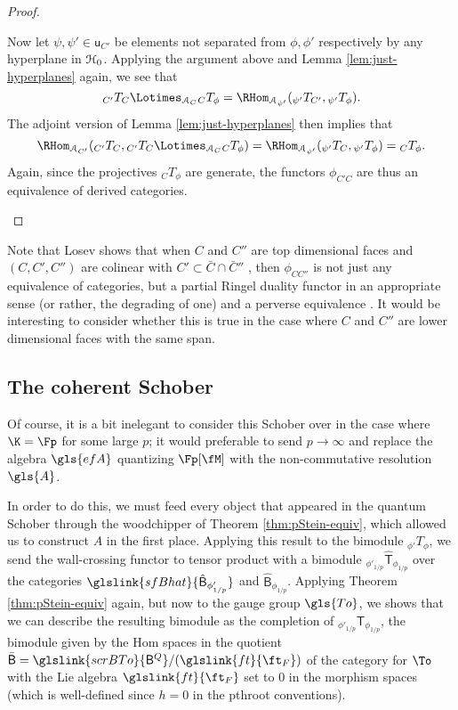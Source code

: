 \begin{proof}
\begin{enumerate}[wide]
  Now let $\psi,\psi'\in \mathsf{u}_{C'}$ be elements not separated from $\phi,\phi'$ respectively by any hyperplane in $\EuScript{H}_0$.  Applying the argument above and Lemma \ref{lem:just-hyperplanes}  again, we see that
  \[{}_{{C'}}T_C\Lotimes_{\EuScript{A}_C}{}_{C}T_{\phi}= \RHom_{\EuScript{A}_{\psi'}}({}_{\psi'}T_{{C'}},  {}_{\psi'}T_\phi).\]  The adjoint version of Lemma  \ref{lem:just-hyperplanes} then implies that
  \[  \RHom_{\EuScript{A}_{C'}}({}_{{C'}}T_C , {}_{{C'}}T_C\Lotimes_{\EuScript{A}_C}{}_{C}T_{\phi})=\RHom_{\EuScript{A}_{\psi'}}({}_{\psi'}T_{C},  {}_{\psi'}T_\phi)={}_{C}T_{\phi}.\]  Again, since the projectives ${}_{C}T_{\phi}$ are generate, the functors $\phi_{{C'}C}$ are thus an equivalence of derived categories.  \qedhere
 \end{enumerate} 
 \end{proof}

Note that Losev shows that when $C$ and $C''$ are top dimensional faces and $(C,{C'},C'')$ are colinear with ${C'}\subset \bar{C}\cap \bar{C}''$ , then $\phi_{CC''}$ is not just any equivalence of categories, but a partial Ringel duality functor in an appropriate sense (or rather, the degrading of one) and a perverse equivalence \cite[Thm. 9.10]{losev2017modular}.  It would be interesting to consider whether this is true in the case where $C$ and $C''$ are lower dimensional faces with the same span.    

\subsection{The coherent Schober}
\label{sec:coherent-schober}

Of course, it is a bit inelegant to consider this Schober over in the case where $\K=\Fp$ for some large $p$; it would preferable to send $p\to \infty $ and replace the algebra $\gls{efA}$  quantizing $\Fp[\fM]$ with the non-commutative resolution $\gls{A}$.    

In order to do this, we must feed every object that appeared in the quantum Schober through the woodchipper of Theorem \ref{thm:pStein-equiv}, which allowed us to construct $A$ in the first place.  
Applying this result to the bimodule ${}_{\phi'}T_\phi$, we send the wall-crossing functor to tensor product with a bimodule $ {}_{\phi'_{1/p}}\mathsf{\hat{T}}_{\phi_{1/p}}$ over the categories $\glslink{sfBhat}{\hat{\mathsf B}_{\phi'_{1/p}}}$ and $\hat{\mathsf B}_{\phi_{1/p}}$.  Applying Theorem \ref{thm:pStein-equiv} again, but now to the gauge group $\gls{To}$, we shows that we can describe the resulting bimodule as the completion of $ {}_{\phi'_{1/p}}\mathsf{T}_{\phi_{1/p}}$, the bimodule given by the Hom spaces in the quotient $\bar{\mathsf B} =\glslink{scrBTo}{{\mathsf B}^Q} /(\glslink{ft}{\ft_F})$ of the category for $\To$ with  the Lie algebra $\glslink{ft}{\ft_F}$ set to 0 in the morphism spaces (which is well-defined since $h=0$ in the \gls{pthroot} conventions).    


